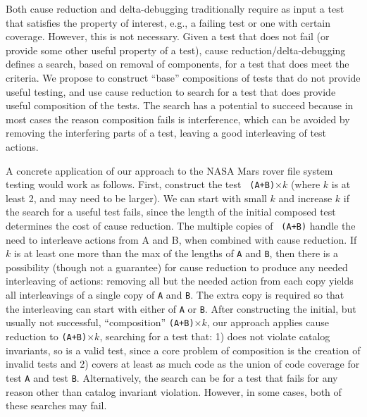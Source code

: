 Both cause reduction and delta-debugging traditionally require as
input a test that satisfies the property of interest, e.g., a failing
test or one with certain coverage.  However, this is not necessary.
Given a test that does not fail (or provide some other useful property
of a test), cause reduction/delta-debugging defines a search, based on
removal of components, for a test that does meet the criteria.  We
propose to construct “base” compositions of tests that do not provide
useful testing, and use cause reduction to search for a test that does
provide useful composition of the tests.  The search has a potential
to succeed because in most cases the reason composition fails is
interference, which can be avoided by removing the interfering parts
of a test, leaving a good interleaving of test actions.

A concrete application of our approach to the NASA Mars rover file
system testing would work as follows.  First, construct the test {\tt
  (A+B)}$\times k$ (where $k$ is at least 2, and may need to be
larger).  We can start with small $k$ and increase $k$ if the search
for a useful test fails, since the length of the initial composed test
determines the cost of cause reduction.  The multiple copies of {\tt
  (A+B)} handle the need to interleave actions from A and B, when
combined with cause reduction.  If $k$ is at least one more than the
max of the lengths of {\tt A} and {\tt B}, then there is a possibility
(though not a guarantee) for cause reduction to produce any needed
interleaving of actions: removing all but the needed action from each
copy yields all interleavings of a single copy of {\tt A} and {\tt B}.
The extra copy is required so that the interleaving can start with
either of {\tt A} or {\tt B}.  After constructing the initial, but
usually not successful, “composition” {\tt (A+B)}$\times k$, our
approach applies cause reduction to {\tt (A+B)}$\times k$, searching
for a test that: 1) does not violate catalog invariants, so is a valid
test, since a core problem of composition is the creation of invalid
tests and 2) covers at least as much code as the union of code
coverage for test {\tt A} and test {\tt B}.  Alternatively, the search
can be for a test that fails for any reason other than catalog
invariant violation.  However, in some cases, both of these searches
may fail.

